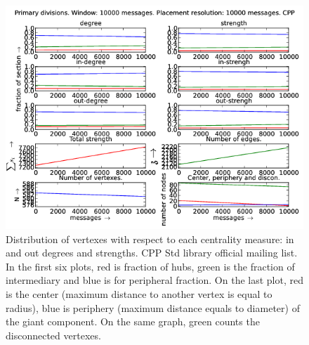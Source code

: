 \documentclass[%
 aip,
 jmp,%
 amsmath,amssymb,
 reprint,%
]{revtex4-1}
\begin{document}
\begin{figure}[hb]
   \centering
        \includegraphics[width=\textwidth]{figs/CPP/10000}
    \caption{Distribution of vertexes with respect to each centrality measure: in and out degrees and strengths. CPP Std library official mailing list. In the first six plots, red is fraction of hubs, green is the fraction of intermediary and blue is for peripheral fraction. On the last plot, red is the center (maximum distance to another vertex is equal to radius), blue is periphery (maximum distance equals to diameter) of the giant component. On the same graph, green counts the disconnected vertexes.}
    \label{fig:cpp10000}
\end{figure}
\end{document}
